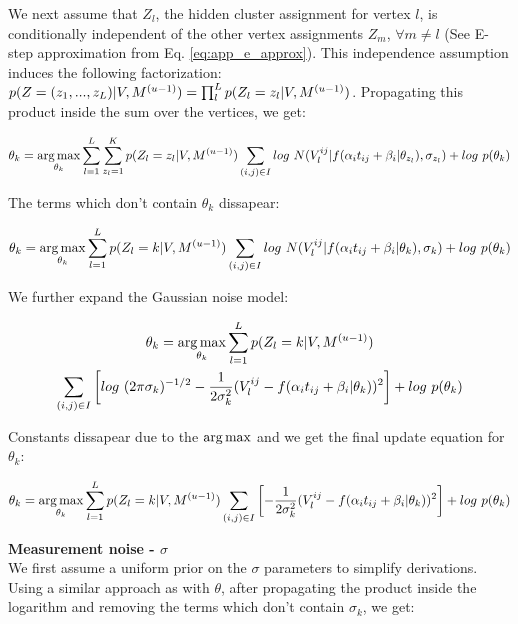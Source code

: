 \begin{sloppypar}
We next assume that $Z_l$, the hidden cluster assignment for vertex $l$, is conditionally independent of the other vertex assignments $Z_m$, $\forall m \neq l$ (See E-step approximation from Eq. \ref{eq:app_e_approx}). This independence assumption induces the following factorization: ${p(Z = (z_1, ..., z_L) | V, M^{(u-1)}) = \prod_l^L p(Z_l = z_l | V, M^{(u-1)})}$. Propagating this product inside the sum over the vertices, we get:
\end{sloppypar}


\begin{equation}
\label{eq:SupTheta5}
 \theta_k = \operatorname*{arg\,max}_{\theta_k} \sum_{l=1}^L \sum_{z_l = 1}^K p(Z_l = z_l | V, M^{(u-1)}) \sum_{(i,j) \in I} log\ N(V_l^{ij} | f(\alpha_i t_{ij} + \beta_i | \theta_{z_l}), \sigma_{z_l}) + log\ p(\theta_k)
\end{equation}

The terms which don't contain $\theta_k$ dissapear:

\begin{equation}
 \theta_k = \argmax_{\theta_k} \sum_{l=1}^L p(Z_l = k | V, \Mu^{(u-1)}) \sum_{(i,j) \in I} log\ N(V_l^{ij} | f(\alpha_i t_{ij} + \beta_i | \theta_k), \sigma_k) + log\ p(\theta_k)
\end{equation}

We further expand the Gaussian noise model:

\begin{multline}
 \theta_k = \operatorname*{arg\,max}_{\theta_k} \sum_{l=1}^L p(Z_l = k | V, M^{(u-1)}) \\ \sum_{(i,j) \in I} \left[ log\ (2 \pi \sigma_k)^{-1/2} - \frac{1}{2\sigma_k^2}(V_l^{ij} - f(\alpha_i t_{ij} + \beta_i | \theta_k))^2 \right] + log\ p(\theta_k)
\end{multline}

Constants dissapear due to the $\operatorname*{arg\,max}$ and we get the final update equation for $\theta_k$:

\begin{equation}
 \theta_k = \operatorname*{arg\,max}_{\theta_k} \sum_{l=1}^L p(Z_l = k | V, M^{(u-1)}) \sum_{(i,j) \in I} \left[ - \frac{1}{2\sigma_k^2}(V_l^{ij} - f(\alpha_i t_{ij} + \beta_i | \theta_k))^2 \right] + log\ p(\theta_k)
\end{equation}

\textbf{Measurement noise - $\sigma$}\\

We first assume a uniform prior on the $\sigma$ parameters to simplify derivations. Using a similar approach as with $\theta$, after propagating the product inside the logarithm and removing the terms which don't contain $\sigma_k$, we get:

